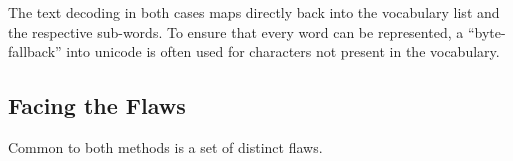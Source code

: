 \documentclass[11pt]{article}
\newcommand\todo[1]{\textcolor{red}{#1}}
\newcommand{\ps}[1]{\textcolor{purple}{PS: #1}}
\begin{document}
The text decoding in both cases maps directly back into the vocabulary list and the respective sub-words. 
To ensure that every word can be represented, a ``byte-fallback'' into unicode is often used for characters not present in the vocabulary.





\subsection{Facing the Flaws} \label{sec:flaws}




Common to both methods is a set of distinct flaws.

%
\end{document}
